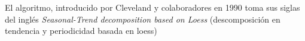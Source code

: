 El algoritmo, introducido por Cleveland y colaboradores en 1990 \cite{Cleveland1990} toma sus siglas
del ingl\'es \textit{Seasonal-Trend decomposition based on Loess} (descomposici\'on en tendencia y
periodicidad basada en loess)

